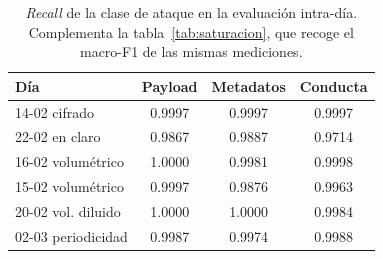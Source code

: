 \begin{table}[htbp]
  \centering
  \caption[Recall intra-día por vista]{\emph{Recall} de la clase de ataque en la evaluación intra-día. Complementa la tabla~\ref{tab:saturacion}, que recoge el macro-F1 de las mismas mediciones.}
  \label{tab:anexo-recall}
  \begin{tabular}{lccc}
    \toprule
    \textbf{Día} & \textbf{Payload} & \textbf{Metadatos} & \textbf{Conducta} \\
    \midrule
    14-02 cifrado & 0.9997 & 0.9997 & 0.9997 \\
    22-02 en claro & 0.9867 & 0.9887 & 0.9714 \\
    16-02 volumétrico & 1.0000 & 0.9981 & 0.9998 \\
    15-02 volumétrico & 0.9997 & 0.9876 & 0.9963 \\
    20-02 vol. diluido & 1.0000 & 1.0000 & 0.9984 \\
    02-03 periodicidad & 0.9987 & 0.9974 & 0.9988 \\
    \bottomrule
  \end{tabular}
\end{table}
